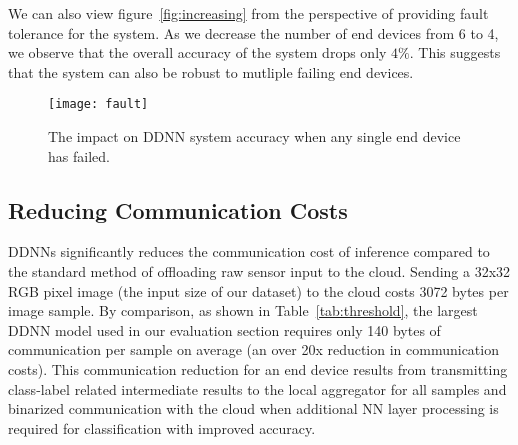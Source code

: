 \documentclass[10pt, conference, compsocconf]{IEEEtran}
\begin{document}
We can also view figure~\ref{fig:increasing} from the perspective of providing fault tolerance for the system. As we decrease the number of end devices from 6 to 4, we observe that the overall accuracy of the system drops only $4\%$. This suggests that the system can also be robust to mutliple failing end devices.

\begin{figure}
    \centering
    \texttt{[image: fault]}
    \caption{The impact on DDNN system accuracy when any single end device has failed.}
    \label{fig:fault}
\end{figure}


\subsection{Reducing Communication Costs}
\label{sec:comm}
DDNNs significantly reduces the communication cost of inference compared to the standard method of offloading raw sensor input to the cloud. Sending a 32x32 RGB pixel image (the input size of our dataset) to the cloud costs 3072 bytes per image sample. By comparison, as shown in Table~\ref{tab:threshold}, the largest DDNN model used in our evaluation section requires only 140 bytes of communication per sample on average (an over 20x reduction in communication costs). This communication reduction for an end device results from transmitting class-label related intermediate results to the local aggregator for all samples and binarized communication with the cloud when additional NN layer processing is required for classification with improved accuracy.
\end{document}
